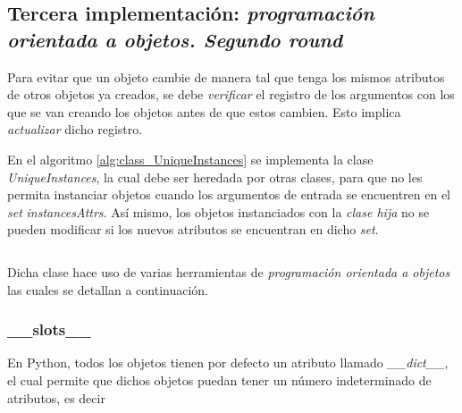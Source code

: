 \documentclass{article}
\newenvironment{code}{\captionsetup{type=listing}}{}
\begin{document}

	\subsection{Tercera implementación: \emph{programación orientada a objetos. \emph{Segundo round}}}

	Para evitar que un objeto cambie de manera tal que tenga los mismos atributos de otros objetos ya creados, se debe \emph{verificar} el registro de los argumentos con los que se van creando los objetos antes de que estos cambien. Esto implica \emph{actualizar} dicho registro.

	En el algoritmo \ref{alg:class_UniqueInstances} se implementa la clase \emph{UniqueInstances}, la cual debe ser heredada por otras clases, para que no les permita instanciar objetos cuando los argumentos de entrada se encuentren en el \emph{set} \emph{instancesAttrs}. Así mismo, los objetos instanciados con la \emph{clase hija} no se pueden modificar  si los nuevos atributos se encuentran en dicho \emph{set}.
	\begin{code}
		\inputminted[firstline=1, lastline=49, breaklines, linenos]{python}{collection_class.py}
		\label{alg:class_UniqueInstances}
	\end{code}

	Dicha clase hace uso de varias herramientas de \emph{programación orientada a objetos} las cuales se detallan a continuación.

	\subsubsection{\_\_slots\_\_}

	\begin{sloppypar}
		En Python, todos los objetos tienen por defecto un atributo llamado \emph{\_\_dict\_\_}, el cual permite que dichos objetos puedan tener un número indeterminado de atributos, es decir
	\end{sloppypar}
	\inputminted[firstline=1, lastline=7]{python}{dumpy.py}
\end{document}
